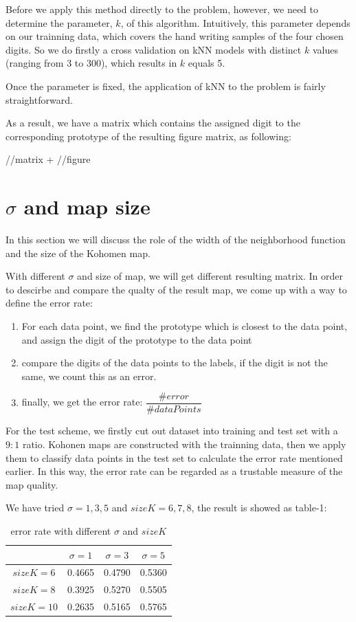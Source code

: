 \documentclass[a4paper, 12pt]{article}
\begin{document}
Before we apply this method directly to the problem, however, we need
to determine the parameter, $k$, of this algorithm. Intuitively, this
parameter depends on our trainning data, which covers the hand
writing samples of the four chosen digits. So we do firstly a cross
validation on kNN models with distinct $k$ values (ranging from 3 to 300),
which results in $k$ equals 5.

Once the parameter is fixed, the application of kNN to the problem is fairly straightforward.

As a result, we have a matrix which contains the assigned digit to the corresponding prototype of the resulting figure matrix, as following:

//matrix + //figure

\section{$\sigma$ and map size}
In this section we will discuss the role of the width of the neighborhood function and the size of the Kohomen map.

With different $\sigma$ and size of map, we will get different
resulting matrix. In order to descirbe and compare the qualty of the
result map, we come up with a way to define the error rate:

\begin{enumerate}
\item For each data point, we find the prototype which is closest to
  the data point, and assign the digit of the prototype to the data
  point
\item compare the digits of the data points to the labels, if the
  digit is not the same, we count this as an error.
\item finally, we get the error rate: $\dfrac{\#error}{\#dataPoints}$
\end{enumerate}

For the test scheme, we firstly cut out dataset into training and test
set with a $9:1$ ratio. Kohonen maps are constructed with the
trainning data, then we apply them to classify data points in the test
set to calculate the error rate mentioned earlier. In this way, the
error rate can be regarded as a trustable measure of the map quality.

We have tried $\sigma = 1, 3, 5$ and $sizeK = 6, 7, 8$, the result is showed as table-1:

\begin{table}[!hbp]
\centering
\begin{tabular}{|c|c|c|c|}
\hline
 & $\sigma = 1$ & $\sigma = 3$ & $\sigma = 5$\\
\hline
$sizeK = 6$ &  0.4665 & 0.4790 & 0.5360\\
\hline
$sizeK = 8$ & 0.3925 & 0.5270 & 0.5505\\
\hline
$sizeK = 10$ & 0.2635 & 0.5165 & 0.5765\\
\hline
\end{tabular}
\caption{error rate with different $\sigma$ and $sizeK$}
\end{table}
\end{document}
